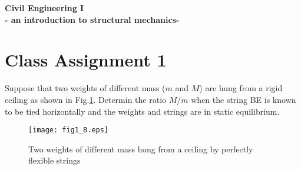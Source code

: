 \documentclass[10pt,a4j]{article}
\newlength{\minitwocolumn}
\begin{document}
\newcommand{\fat}[1]{\mbox{\boldmath $#1$}}
\newcommand{\D}{\partial}
\newcommand{\w}{\omega}
\newcommand{\ga}{\alpha}
\newcommand{\gb}{\beta}
\newcommand{\gx}{\xi}
\newcommand{\gz}{\zeta}
\newcommand{\vhat}[1]{\hat{\fat{#1}}}
\newcommand{\spc}{\vspace{0.7\baselineskip}}
\newcommand{\halfspc}{\vspace{0.3\baselineskip}}

\newcommand{\twofig}[2]
 {
   \begin{figure}
     \begin{minipage}[t]{\minitwocolumn}
         \begin{center}   #1
         \end{center}
     \end{minipage}
         \hspace{\columnsep}
     \begin{minipage}[t]{\minitwocolumn}
         \begin{center} #2
         \end{center}
     \end{minipage}
   \end{figure}
 }
\begin{center}
	{\Large \bf  Civil Engineering I \\ 
	- an introduction to structural mechanics-\\
	}
\end{center}
\hspace{10mm}
\section*{Class Assignment 1}
	Suppose that two weights of different mass ($m$ and $M$) are hung from a rigid ceiling as shown in Fig.\ref{fig:fig1_8}.
	Determin the ratio $M/m$ when the string BE is known to be tied horizontally and the weights and strings are in static equilibrium.
	\begin{figure}[h]
		\begin{center}
		\texttt{[image: fig1\_8.eps]} 
		\end{center}
		\caption{Two weights of different mass hung from a ceiling by perfectly flexible strings} 
		\label{fig:fig1_8}
	\end{figure}
\end{document}
